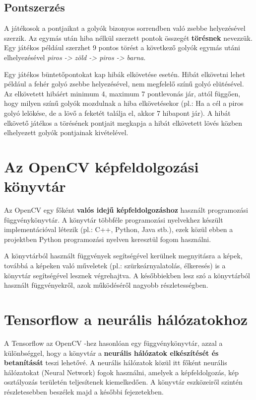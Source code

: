 \subsection{Pontszerzés}
A játékosok a pontjaikat a golyók bizonyos sorrendben való zsebbe helyezésével szerzik. Az egymás után hiba nélkül szerzett pontok összegét \textbf{törésnek} nevezzük. Egy játékos például szerzhet 9 pontos törést a következő golyók egymás utáni elhelyezésével \textit{piros -> zöld -> piros -> barna}.\cite{shamos2002new}
\par Egy játékos büntetőpontokat kap hibák elkövetése esetén. Hibát elkövetni lehet például a fehér golyó zsebbe helyezésével, nem megfelelő színű golyó elütésével. Az elkövetett hibáért minimum 4, maximum 7 pontlevonás jár, attól függően, hogy milyen színű golyók mozdulnak a hiba elkövetésekor (pl.: Ha a cél a piros golyó lelökése, de a lövő a feketét találja el, akkor 7 hibapont jár). A hibát elkövető játékos a törésének pontjait megkapja a hibát elkövetett lövés közben elhelyezett golyók pontjainak kivételével.\cite{snooker_rules}

\section{Az OpenCV képfeldolgozási könyvtár}
Az OpenCV egy főként \textbf{valós idejű képfeldolgozáshoz} használt programozási függvénykönyvtár. A könyvtár többféle programozási nyelvekhez készült implementációval létezik (pl.: C++, Python, Java stb.)\cite{opencv_library}, ezek közül ebben a projektben Python programozási nyelven keresztül fogom használni.
\par A könyvtárból használt függvények segítségével kerülnek megnyitásra a képek, továbbá a képeken való műveletek (pl.: szürkeárnyalatolás, élkeresés) is a könyvtár segítségével lesznek végrehajtva. A későbbiekben lesz szó a könyvtárból használt függvényekről, azok működéséről nagyobb részletességben.

\section{Tensorflow a neurális hálózatokhoz}
A Tensorflow az OpenCV -hez hasonlóan egy függvénykönyvtár, azzal a különbséggel, hogy a könyvtár a \textbf{neurális hálózatok elkészítését és betanítását} teszi lehetővé.\cite{tensorflow} A neurális hálózatok közül itt főként neurális hálózatokat (Neural Network) fogok használni, amelyek a képfeldolgozás, kép osztályozás területén teljesítenek kiemelkedően. A könyvtár eszközeiről szintén részletesebben beszélek majd a későbbi fejezetekben.